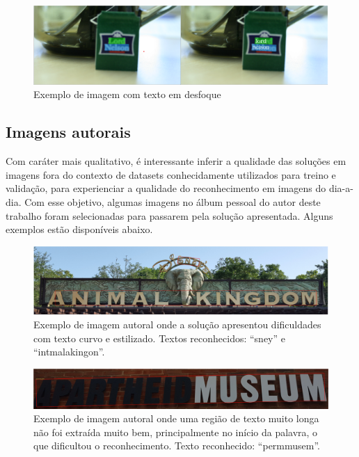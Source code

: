 \begin{figure}
    \centering
    \includegraphics[width=\textwidth]{figs/resultados-icdar13-04.png}
    \caption{Exemplo de imagem com texto em desfoque}
    \label{fig:results_icdar13_04}
\end{figure}


\subsection{Imagens autorais}\label{sec:results_own_images}
Com caráter mais qualitativo, é interessante inferir a qualidade das soluções em imagens fora do contexto de datasets conhecidamente utilizados para treino e validação, para experienciar a qualidade do reconhecimento em imagens do dia-a-dia. Com esse objetivo, algumas imagens no álbum pessoal do autor deste trabalho foram selecionadas para passarem pela solução apresentada. Alguns exemplos estão disponíveis abaixo.

\begin{figure}
    \centering
    \includegraphics[width=\textwidth]{figs/resultados-autoral-01.png}
    \caption{Exemplo de imagem autoral onde a solução apresentou dificuldades com texto curvo e estilizado. Textos reconhecidos: “sney” e “intmalakingon”.}
    \label{fig:results_own_images_01}
\end{figure}

\begin{figure}
    \centering
    \includegraphics[width=\textwidth]{figs/resultados-autoral-02.png}
    \caption{Exemplo de imagem autoral onde uma região de texto muito longa não foi extraída muito bem, principalmente no início da palavra, o que dificultou o reconhecimento. Texto reconhecido: “permmusem”.}
    \label{fig:results_own_images_02}
\end{figure}


